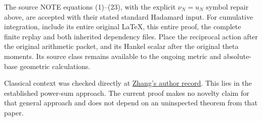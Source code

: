 The source NOTE equations (1)--(23), with the explicit \(\nu_N=u_N\) symbol repair above, are accepted with their stated standard Hadamard input. For cumulative integration, include its entire original LaTeX, this entire proof, the complete finite replay and both inherited dependency files. Place the reciprocal action after the original arithmetic packet, and its Hankel scalar after the original theta moments. Its source class remains available to the ongoing metric and absolute-base geometric calculations.

Classical context was checked directly at \href{https://arxiv.org/abs/1510.03420}{Zhang's author record}. This lies in the established power-sum approach. The current proof makes no novelty claim for that general approach and does not depend on an uninspected theorem from that paper.
